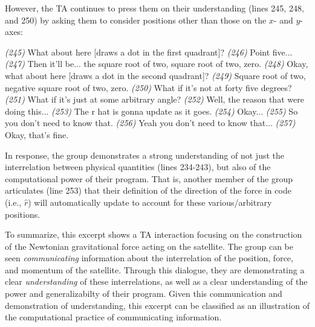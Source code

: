 \documentclass{msuphddissertation}
\begin{document}
\begin{doublespace}
However, the TA continues to press them on their understanding (lines 245, 248, and 250) by asking them to consider positions other than those on the $x$- and $y$-axes: \begin{description}
\TA \textit{(245)} What about here [draws a dot in the first quadrant]?
\SD \textit{(246)} Point five...
\SB \textit{(247)} Then it'll be... the square root of two, square root of two, zero.
\TA \textit{(248)} Okay, what about here [draws a dot in the second quadrant]?
\SB \textit{(249)} Square root of two, negative square root of two, zero.
\TA \textit{(250)} What if it's not at forty five degrees?
\TA \textit{(251)} What if it's just at some arbitrary angle?
\SB \textit{(252)} Well, the reason that were doing this...			
\SD \textit{(253)} The r hat is gonna update as it goes.
\TA \textit{(254)} Okay...
\SD \textit{(255)} So you don’t need to know that.
\SB \textit{(256)} Yeah you don’t need {to know that}...		
\TA \textit{(257)} Okay, that’s fine.
\end{description}  In response, the group demonstrates a strong understanding of not just the interrelation between physical quantities (lines 234-243), but also of the computational power of their program.  That is, another member of the group articulates (line 253) that their definition of the direction of the force in code (i.e., $\hat{r}$) will automatically update to account for these various/arbitrary positions.

To summarize, this excerpt shows a TA interaction focusing on the construction of the Newtonian gravitational force acting on the satellite.  The group can be seen \textit{communicating} information about the interrelation of the position, force, and momentum of the satellite.  Through this dialogue, they are demonstrating a clear \textit{understanding} of these interrelations, as well as a clear understanding of the power and generalizabilty of their program.  Given this communication and demonstration of understanding, this excerpt can be classified as an illustration of the computational practice of communicating information.



\end{doublespace}
\end{document}

